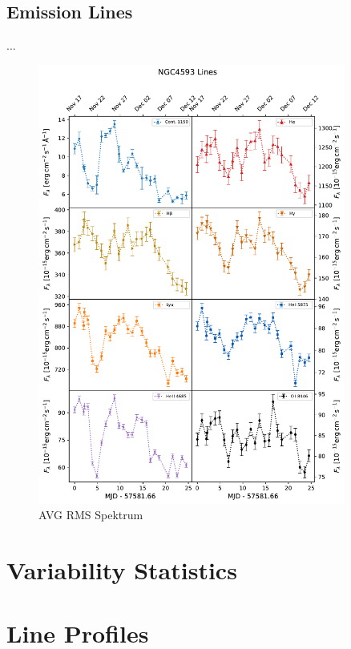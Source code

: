 \subsection{Emission Lines}
...
\begin{figure}[!ht]
	\centering
	\includegraphics[width=0.9\textwidth]{pictures/Chapter4/lightcurves/NGC4593_Lines.pdf}
	\caption{AVG RMS Spektrum}
	\label{fig:emission_line_lightcurves}
\end{figure}

\section{Variability Statistics}

\section{Line Profiles}

